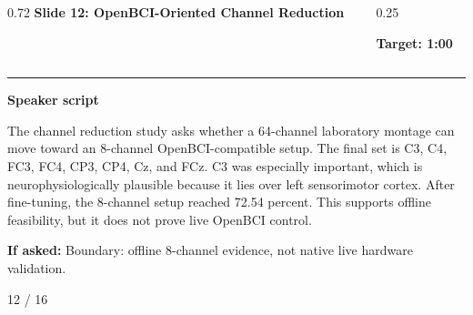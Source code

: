 \documentclass[aspectratio=169,10pt]{beamer}
\begin{document}
\begin{frame}[plain]
\vspace*{0.16cm}
\begin{columns}[T,totalwidth=\textwidth]
\begin{column}{0.72\textwidth}
{\fontsize{17}{18.5}\selectfont\bfseries Slide 12: OpenBCI-Oriented Channel Reduction}
\end{column}
\begin{column}{0.25\textwidth}
\raggedleft
\colorbox{noteCream}{\parbox{0.88\linewidth}{\centering\bfseries Target: 1:00}}
\end{column}
\end{columns}
\vspace{0.10cm}
{\color{uomPurple}\rule{\textwidth}{1.2pt}}
\vspace{0.18cm}
{\color{uomPurple}\bfseries Speaker script}
\vspace{0.06cm}
\setlength{\fboxsep}{6pt}
\noindent\colorbox{panelGrey}{\begin{minipage}{0.94\textwidth}
\justifying\fontsize{11.0}{13.4}\selectfont
The channel reduction study asks whether a 64-channel laboratory montage can move toward an 8-channel OpenBCI-compatible setup. The final set is C3, C4, FC3, FC4, CP3, CP4, Cz, and FCz. C3 was especially important, which is neurophysiologically plausible because it lies over left sensorimotor cortex. After fine-tuning, the 8-channel setup reached 72.54 percent. This supports offline feasibility, but it does not prove live OpenBCI control.
\end{minipage}}
\vspace{0.22cm}
\noindent\colorbox{noteCream}{\begin{minipage}{0.94\textwidth}
\fontsize{9.6}{11.6}\selectfont
{\bfseries If asked:} Boundary: offline 8-channel evidence, not native live hardware validation.
\end{minipage}}
\vfill
\hfill{\color{textDark}\scriptsize 12 / 16}
\end{frame}
\end{document}
